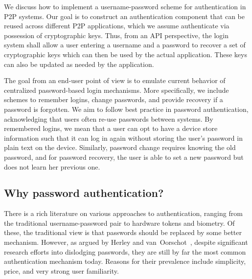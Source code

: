 We discuss how to implement a username-password scheme for  authentication
in P2P systems. Our goal is to construct an authentication
component that can be reused across different P2P applications, which we assume 
authenticate via possession of cryptographic keys. Thus, from an API 
perspective, the login system shall allow a user entering a username and a password
to recover a set of cryptographic keys which can then be used by the actual
application. These keys can also be updated as needed
by the application.

The goal from an end-user point of view is to emulate current behavior 
of centralized password-based login mechanisms. More specifically,
we include schemes to remember logins, change passwords, and provide
recovery if a password is forgotten.  We aim to follow best practice in
password authentication, acknowledging that users often re-use passwords
between systems. By remembered logins, we mean that a user can opt to have
a device store information such that it can log in again without storing the
user's password in plain text on the device. 
Similarly, password change requires knowing the old password, and for
password recovery, the user is able to set a new password but does not learn
her previous one.


\subsection{Why password authentication?}

There is a rich literature on various approaches to authentication, ranging
from the traditional username-password pair to hardware tokens and
biometry. Of these, the traditional view is that passwords should be replaced
by some better mechanism. However, as argued by Herley and
van~Oorschot~\cite{HerleyO12}, despite significant research efforts into
dislodging passwords, they are still by far the most common authentication
mechanism today. Reasons for their prevalence include simplicity, price, and
very strong user familiarity.

